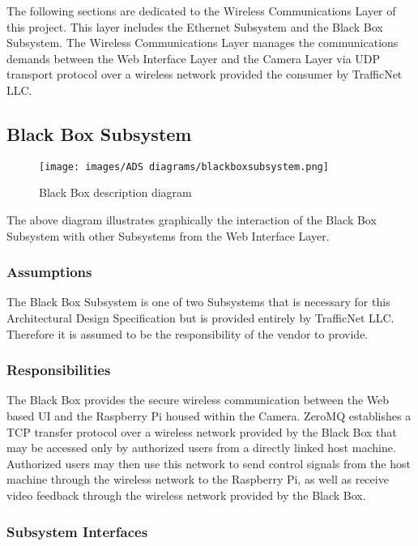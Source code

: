 The following sections are dedicated to the Wireless Communications Layer of this project. This layer includes the Ethernet Subsystem and the Black Box Subsystem. The Wireless Communications Layer manages the communications demands between the Web Interface Layer and the Camera Layer via UDP transport protocol over a wireless network provided the consumer by TrafficNet LLC.

\subsection{Black Box Subsystem}

\begin{figure}[h!]
	\centering
 	\texttt{[image: images/ADS diagrams/blackboxsubsystem.png]}
 \caption{Black Box description diagram}
\end{figure}

The above diagram illustrates graphically the interaction of the Black Box Subsystem with other Subsystems from the Web Interface Layer. 

\subsubsection{Assumptions}
The Black Box Subsystem is one of two Subsystems that is necessary for this Architectural Design Specification but is provided entirely by TrafficNet LLC. Therefore it is assumed to be the responsibility of the vendor to provide.

\subsubsection{Responsibilities}
The Black Box provides the secure wireless communication between the Web based UI and the Raspberry Pi housed within the Camera. ZeroMQ establishes a TCP transfer protocol over a wireless network provided by the Black Box that may be accessed only by authorized users from a directly linked host machine. Authorized users may then use this network to send control signals from the host machine through the wireless network to the Raspberry Pi, as well as receive video feedback through the wireless network provided by the Black Box.

\subsubsection{Subsystem Interfaces}

